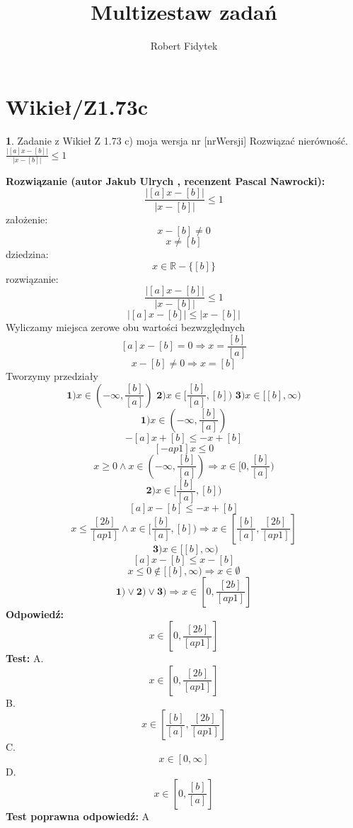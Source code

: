\documentclass[12pt, a4paper]{article}
\title{Multizestaw zadań}
\author{Robert Fidytek}
\date{}
\theoremstyle{definition} %
\newtheorem{zad}{}
\newcommand{\kategoria}[1]{\section{#1}} %
\newcommand{\zadStart}[1]{\begin{zad}#1\newline} %
\newcommand{\zadStop}{\end{zad}}   %
\newcommand{\rozwStart}[2]{\noindent \textbf{Rozwiązanie (autor #1 , recenzent #2): }\newline} %
\newcommand{\rozwStop}{\newline}                                            %
\newcommand{\odpStart}{\noindent \textbf{Odpowiedź:}\newline}    %
\newcommand{\odpStop}{\newline}                                             %
\newcommand{\testStart}{\noindent \textbf{Test:}\newline} %
\newcommand{\testStop}{\newline} %
\newcommand{\kluczStart}{\noindent \textbf{Test poprawna odpowiedź:}\newline} %
\newcommand{\kluczStop}{\newline} %
\begin{document}
\maketitle


\kategoria{Wikieł/Z1.73c}
\zadStart{Zadanie z Wikieł Z 1.73 c) moja wersja nr [nrWersji]}
Rozwiązać nierówność.$\frac{|[a]x-[b]|}{|x-[b]|}\leq1$
\zadStop
\rozwStart{Jakub Ulrych}{Pascal Nawrocki}
$$\frac{|[a]x-[b]|}{|x-[b]|}\leq1$$
założenie: $$x-[b]\neq0$$
$$x\neq[b]$$
dziedzina:$$x\in\mathbb{R}-\{[b]\}$$
rozwiązanie:$$\frac{|[a]x-[b]|}{|x-[b]|}\leq1$$
$$|[a]x-[b]|\leq|x-[b]|$$
Wyliczamy miejsca zerowe obu wartości bezwzględnych
$$[a]x-[b]=0\Rightarrow x=\frac{[b]}{[a]}$$
$$x-[b]\neq0\Rightarrow x=[b]$$
Tworzymy przedziały
$$\textbf{1)}x\in(-\infty,\frac{[b]}{[a]})\textbf{  2)}x\in[\frac{[b]}{[a]},[b])\textbf{  3)}x\in[[b],\infty)$$
$$\textbf{1)}x\in(-\infty,\frac{[b]}{[a]})$$
$$-[a]x+[b]\leq-x+[b]$$
$$[-ap1]x\leq0$$
$$x\geq0\land x\in(-\infty,\frac{[b]}{[a]})\Rightarrow x\in[0,\frac{[b]}{[a]})$$
$$\textbf{2)}x\in[\frac{[b]}{[a]},[b])$$
$$[a]x-[b]\leq-x+[b]$$
$$x\leq\frac{[2b]}{[ap1]}\land x\in[\frac{[b]}{[a]},[b])\Rightarrow x\in[\frac{[b]}{[a]},\frac{[2b]}{[ap1]}]$$
$$\textbf{  3)}x\in[[b],\infty)$$
$$[a]x-[b]\leq x-[b]$$
$$x\leq0\notin[[b],\infty)\Rightarrow x\in\emptyset$$
$$\textbf{1)} \vee \textbf{2)} \vee \textbf{3)}\Rightarrow x\in[0,\frac{[2b]}{[ap1]}]$$
\rozwStop
\odpStart
$$x\in[0,\frac{[2b]}{[ap1]}]$$
\odpStop
\testStart
A.$$x\in[0,\frac{[2b]}{[ap1]}]$$
B.$$x\in[\frac{[b]}{[a]},\frac{[2b]}{[ap1]}]$$
C.$$x\in[0,\infty]$$
D.$$x\in[0,\frac{[b]}{[a]}]$$
\testStop
\kluczStart
A
\kluczStop
\end{document}
